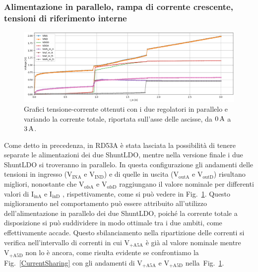 % 
%

\subsubsection{Alimentazione in parallelo, rampa di corrente crescente, tensioni di riferimento interne} 

\begin{figure}[h]
\centering
\includegraphics[width=\textwidth]{Immagini/PUI}
\caption{Grafici tensione-corrente ottenuti con i due regolatori in parallelo e variando la corrente totale, riportata sull'asse delle ascisse, da $0\rm \, A$ a $3\rm \, A$.}
\label{PUI}
\end{figure}
Come detto in precedenza, in RD53A è stata lasciata la possibilità di tenere separate le alimentazioni dei due ShuntLDO, mentre nella versione finale i due ShuntLDO si troveranno in parallelo. 
In questa configurazione gli andamenti delle tensioni in ingresso ($\mathrm{V_{INA}}$ e $\mathrm{V_{IND}}$) e di quelle in uscita ($\mathrm{V_{outA}}$ e $\mathrm{V_{outD}}$) risultano migliori, nonostante che $\mathrm{V_{ofsA}}$ e $\mathrm{V_{ofsD}}$ raggiungano il valore nominale per differenti valori di $\mathrm{I_{inA}}$ e $\mathrm{I_{inD}}$ , rispettivamente, come si può vedere in Fig.~\ref{PUI}.
Questo miglioramento nel comportamento può essere attribuito all'utilizzo dell'alimentazione in parallelo dei due ShuntLDO, poiché la corrente totale a disposizione si può suddividere in modo ottimale tra i due ambiti, come effettivamente accade. Questo sbilanciamento nella ripartizione delle correnti si verifica nell'intervallo di correnti in cui $\mathrm{V_{+A5A}}$ \`e gi\`a al valore nominale mentre $\mathrm{V_{+A5D}}$ non lo \`e ancora, come risulta evidente se confrontiamo la Fig.~\ref{CurrentSharing} con gli andamenti di $\mathrm{V_{+A5A}}$ e $\mathrm{V_{+A5D}}$ nella~Fig.~\ref{PUI}.

